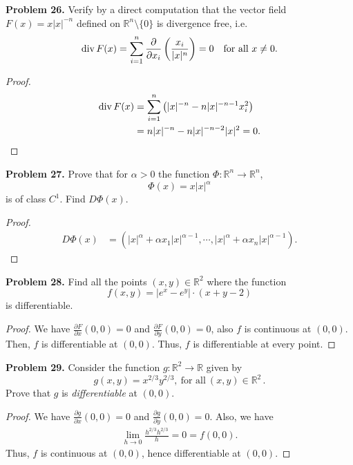 \documentclass[12pt,leqno]{amsart}
\theoremstyle{definition}
\begin{document}
\medskip

\noindent
{\bf Problem 26.}
Verify by a direct computation that the vector field $F(x)=x|x|^{-n}$ defined on
$\mathbb{R}^n\setminus\{0\}$ is divergence free, i.e.
$$
{\rm div}\, F(x)=\sum_{i=1}^n \frac{\partial}{\partial x_i}\left(\frac{x_i}{|x|^n}\right) = 0
\quad
\mbox{for all $x\neq 0$.}
$$
\begin{proof}
\begin{align*}
    {\rm div}\, F(x) & = \sum^n_{i=1} \left(|x|^{-n} - n |x|^{-n-1} x_i^2\right) \\
    & = n |x|^{-n} - n |x|^{-n-2} |x|^2 = 0.
\end{align*}
\end{proof}

\medskip

\noindent
{\bf Problem 27.}
Prove that for $\alpha>0$ the function $\Phi:\mathbb{R}^n\to\mathbb{R}^n$,
$$
\Phi(x)=x|x|^\alpha
$$
is of class $C^1$. Find $D\Phi(x)$.
\begin{proof}
\begin{align*}
    D\Phi(x) & = \left(|x|^\alpha + \alpha x_1 |x|^{\alpha-1}, \cdots, |x|^\alpha + \alpha x_n |x|^{\alpha-1} \right).
\end{align*}
\end{proof}

\medskip

\noindent
{\bf Problem 28.}
Find all the points $(x,y)\in\mathbb{R}^2$ where the function
$$
f(x,y)=|e^x-e^y|\cdot(x+y-2)
$$
is differentiable.
\begin{proof}
We have $\frac{\partial F}{\partial x}(0,0) = 0$ and $\frac{\partial F}{\partial y}(0,0) = 0$, also $f$ is continuous at $(0,0)$. Then, $f$ is differentiable at $(0,0)$. Thus, $f$ is differentiable at every point.
\end{proof}


\medskip

\noindent
{\bf Problem 29.}
Consider the function $g : \mathbb{R}^2 \to \mathbb{R}$ given by
$$
g(x, y) = x^{2/3}y^{2/3}, \ \text{for all} \ (x, y) \in \mathbb{R}^2 \,
.
$$
Prove that $g$ is {\it differentiable} at $(0, 0)$.
\begin{proof}
We have $\frac{\partial g}{\partial x}(0,0) = 0$ and $\frac{\partial g}{\partial y}(0,0) = 0$. Also, we have
\begin{align*}
    \lim_{h\to0} \frac{h^{2/3}h^{2/3}}{h} = 0 = f(0,0).
\end{align*}
Thus, $f$ is continuous at $(0,0)$, hence differentiable at $(0,0)$.
\end{proof}
\end{document}
